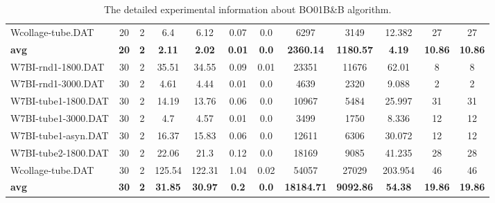 \begin{table}[!h]
{\begin{tabular}{lccccccccccc}
Wcollage-tube.DAT & 20 & 2 & 6.4 & 6.12 & 0.07 & 0.0 & 6297 & 3149 & 12.382 & 27 & 27\\
\cline{1-12} \textbf{avg} & \textbf{20} & \textbf{2} & \textbf{2.11} & \textbf{2.02} & \textbf{0.01} & \textbf{0.0} & \textbf{2360.14} & \textbf{1180.57} & \textbf{4.19} & \textbf{10.86} & \textbf{10.86} \\ \cline{1-12}
W7BI-rnd1-1800.DAT & 30 & 2 & 35.51 & 34.55 & 0.09 & 0.01 & 23351 & 11676 & 62.01 & 8 & 8\\
W7BI-rnd1-3000.DAT & 30 & 2 & 4.61 & 4.44 & 0.01 & 0.0 & 4639 & 2320 & 9.088 & 2 & 2\\
W7BI-tube1-1800.DAT & 30 & 2 & 14.19 & 13.76 & 0.06 & 0.0 & 10967 & 5484 & 25.997 & 31 & 31\\
W7BI-tube1-3000.DAT & 30 & 2 & 4.7 & 4.57 & 0.01 & 0.0 & 3499 & 1750 & 8.336 & 12 & 12\\
W7BI-tube1-asyn.DAT & 30 & 2 & 16.37 & 15.83 & 0.06 & 0.0 & 12611 & 6306 & 30.072 & 12 & 12\\
W7BI-tube2-1800.DAT & 30 & 2 & 22.06 & 21.3 & 0.12 & 0.0 & 18169 & 9085 & 41.235 & 28 & 28\\
Wcollage-tube.DAT & 30 & 2 & 125.54 & 122.31 & 1.04 & 0.02 & 54057 & 27029 & 203.954 & 46 & 46\\
\cline{1-12} \textbf{avg} & \textbf{30} & \textbf{2} & \textbf{31.85} & \textbf{30.97} & \textbf{0.2} & \textbf{0.0} & \textbf{18184.71} & \textbf{9092.86} & \textbf{54.38} & \textbf{19.86} & \textbf{19.86} \\ \cline{1-12}
\bottomrule
\end{tabular}%
}%
\caption{The detailed experimental information about BO01B\&B algorithm.}
\label{tab:table_bb}
\end{table}

